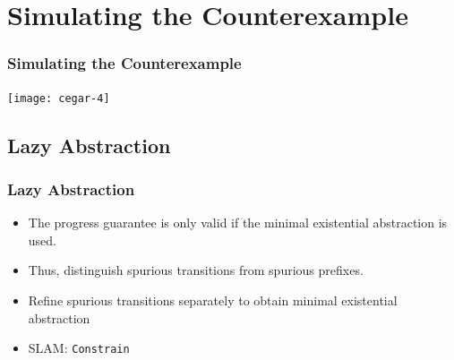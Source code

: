 
\section{Simulating the Counterexample}

\begin{frame}
\frametitle{Simulating the Counterexample}

\begin{center}
\texttt{[image: cegar-4]}
\end{center}

\end{frame}


\subsection{Lazy Abstraction}

\begin{frame}
\frametitle{Lazy Abstraction}

\begin{itemize}
\item The progress guarantee is only valid if the minimal existential
abstraction is used.
\vfill

\item Thus, distinguish \alert{spurious transitions} from \alert{spurious prefixes}.
\vfill

\item Refine spurious transitions separately to obtain minimal existential
abstraction

\item SLAM: {\tt Constrain}

\end{itemize}

\end{frame}


